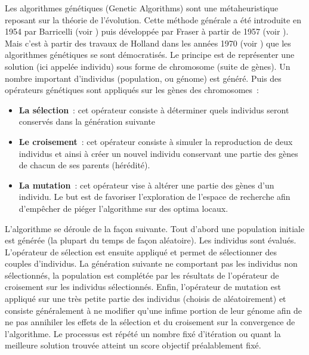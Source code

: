 Les algorithmes génétiques (Genetic Algorithms) sont une métaheuristique reposant sur la théorie de l'évolution. Cette méthode générale a été introduite en 1954 par Barricelli (voir \cite{Barricelli1957}) puis développée par Fraser à partir de 1957 (voir \cite{Fraser1957}). Mais c'est à partir des travaux de Holland dans les années 1970 (voir \cite{Holland1975}) que les algorithmes génétiques se sont démocratisés.
Le principe est de représenter une solution (ici appelée individu) sous forme de chromosome (suite de gènes). Un nombre important d'individus (population, ou génome) est généré. Puis des opérateurs génétiques sont appliqués sur les gènes des chromosomes~:
\begin{itemize}
 \item \textbf{La sélection}~: cet opérateur consiste à déterminer quels individus seront conservés dans la génération suivante
 \item \textbf{Le croisement}~: cet opérateur consiste à simuler la reproduction de deux individus et ainsi à créer un nouvel individu conservant une partie des gènes de chacun de ses parents (hérédité).
 \item \textbf{La mutation}~: cet opérateur vise à altérer une partie des gènes d'un individu. Le but est de favoriser l'exploration de l'espace de recherche afin d'empêcher de piéger l'algorithme sur des optima locaux.
\end{itemize}

L'algorithme se déroule de la façon suivante. Tout d'abord une population initiale est générée (la plupart du temps de façon aléatoire). Les individus sont évalués. L'opérateur de sélection est ensuite appliqué et permet de sélectionner des couples d'individus. La génération suivante ne comportant pas les individus non sélectionnés, la population est complétée par les résultats de l'opérateur de croisement sur les individus sélectionnés. Enfin, l'opérateur de mutation est appliqué sur une très petite partie des individus (choisis de aléatoirement) et consiste généralement à ne modifier qu'une infime portion de leur génome afin de ne pas annihiler les effets de la sélection et du croisement sur la convergence de l'algorithme. Le processus est répété un nombre fixé d'itération ou quant la meilleure solution trouvée atteint un score objectif préalablement fixé.

